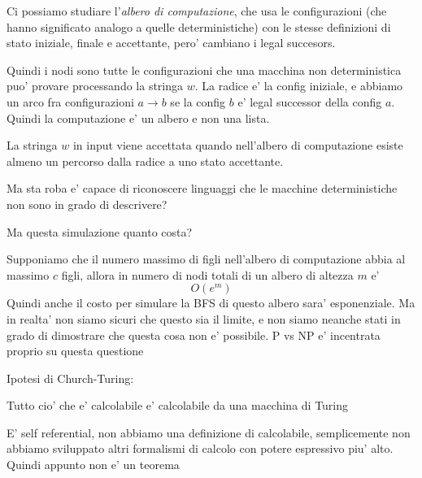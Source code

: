 Ci possiamo studiare l'\textit{albero di computazione}, che usa le configurazioni (che hanno significato analogo a quelle deterministiche) con le stesse definizioni di stato iniziale, finale e accettante, pero' cambiano i legal succesors.

Quindi i nodi sono tutte le configurazioni che una macchina non deterministica puo' provare processando la stringa $ w $.
La radice e' la config iniziale, e abbiamo un arco fra configurazioni $ a \to b $ se la config $ b $ e' legal successor della config $ a $.
Quindi la computazione e' un albero e non una lista.

La stringa $ w $ in input viene accettata quando nell'albero di computazione esiste almeno un percorso dalla radice a uno stato accettante.

Ma sta roba e' capace di riconoscere linguaggi che le macchine deterministiche non sono in grado di descrivere? 


Ma questa simulazione quanto costa? 

Supponiamo che il numero massimo di figli nell'albero di computazione abbia al massimo $ c $ figli, allora in numero di nodi totali di un albero di altezza $ m $ e'
\[
  O(e^m)
\]
Quindi anche il costo per simulare la BFS di questo albero sara' esponenziale. Ma in realta' non siamo sicuri che questo sia il limite, e non siamo neanche stati in grado di dimostrare che questa cosa non e' possibile. P vs NP e' incentrata proprio su questa questione 

Ipotesi di Church-Turing:

Tutto cio' che e' calcolabile e' calcolabile da una macchina di Turing

E' self referential, non abbiamo una definizione di calcolabile, semplicemente non abbiamo sviluppato altri formalismi di calcolo con potere espressivo piu' alto. Quindi appunto non e' un teorema

